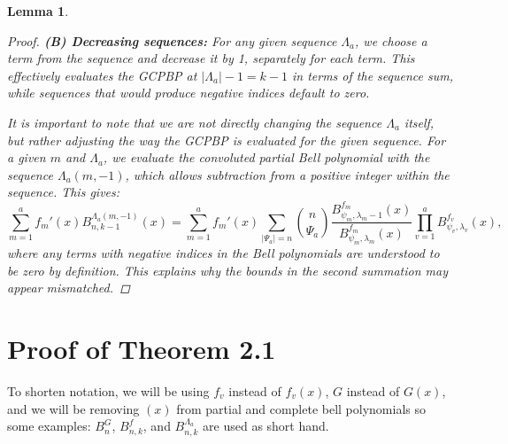 \documentclass[11pt]{article}
\theoremstyle{plain}
\newtheorem{lemma}[theorem]{Lemma}      %
\theoremstyle{definition}
\begin{document}
\begin{lemma}
\begin{proof}
\textbf{(B) Decreasing sequences:}  
For any given sequence $\Lambda_a$, we choose a term from the sequence and decrease it by 1, separately for each term. This effectively evaluates the GCPBP at $|\Lambda_a|-1 = k-1$ in terms of the sequence sum, while sequences that would produce negative indices default to zero.  

It is important to note that we are not directly changing the sequence $\Lambda_a$ itself, but rather adjusting the way the GCPBP is evaluated for the given sequence. For a given $m$ and $\Lambda_a$, we evaluate the convoluted partial Bell polynomial with the sequence $\Lambda_a(m,-1)$, which allows subtraction from a positive integer within the sequence. This gives:
\begin{equation*}
\sum_{m=1}^a f_m'(x)B_{n,k-1}^{\Lambda_a(m,-1)}(x) = \sum_{m=1}^a f_m'(x) \sum_{|\Psi_a|=n} \binom{n}{\Psi_a} \frac{B_{\psi_m,\lambda_m-1}^{f_m}(x)}{B_{\psi_m,\lambda_m}^{f_m}(x)} \prod_{v=1}^a B_{\psi_v,\lambda_v}^{f_v}(x),
\end{equation*}
where any terms with negative indices in the Bell polynomials are understood to be zero by definition. This explains why the bounds in the second summation may appear mismatched.
\end{proof}
\end{lemma}

\section{Proof of Theorem 2.1}
To shorten notation, we will be using $f_v$ instead of $f_v(x)$, $G$ instead of $G(x)$, and we will be removing $(x)$ from partial and complete bell polynomials so some examples: $B_n^G$, $B_{n,k}^f$, and $B_{n,k}^{\Lambda_a}$ are used as short hand.
\end{document}
